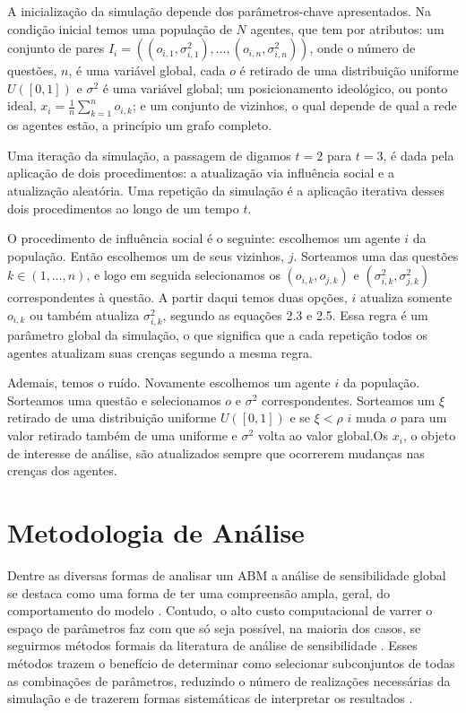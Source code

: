 A inicialização da simulação depende dos parâmetros-chave apresentados. Na
condição inicial temos uma população de \(N\) agentes, que tem por atributos: um
conjunto de pares \(I_i = ((o_{i,1},\sigma_{i,1}^2), \ldots, (o_{i,n},\sigma_{i,n}^2))\), onde
o número de questões, \(n\), é uma variável global, cada \(o\) é retirado de uma
distribuição uniforme \(U([0,1])\) e \(\sigma^2\) é uma variável global; um posicionamento
ideológico, ou ponto ideal, \(x_i = \frac{1}{n} \sum_{k = 1}^n o_{i,k} \); e um
conjunto de vizinhos, o qual depende de qual a rede os agentes estão, a
princípio um grafo completo.

 Uma iteração da simulação, a
passagem de digamos \(t=2\) para \(t=3\), é dada pela aplicação de dois
procedimentos: a atualização via influência social e a atualização aleatória.
Uma repetição da simulação é a aplicação iterativa desses dois procedimentos ao
longo de um tempo \(t \).

O procedimento de influência social é o seguinte: escolhemos um agente \(i\)
da população. Então escolhemos um de seus vizinhos, \(j\). Sorteamos uma das
questões \(k \in (1,\ldots,n)\), e logo em seguida selecionamos os \((o_{i,k},o_{j,k})\) e
\((\sigma_{i,k}^2,\sigma_{j,k}^2)\) correspondentes à questão. A partir daqui temos duas
opções, \(i\) atualiza somente \(o_{i,k}\) ou também atualiza \(\sigma_{i,k}^2\),
segundo as equações 2.3 e 2.5. Essa regra é um parâmetro global da simulação,
o que significa que a cada repetição todos os agentes atualizam suas crenças
segundo a mesma regra.

Ademais, temos o ruído. Novamente escolhemos um agente \(i\) da população.
Sorteamos uma questão e selecionamos \(o\) e \(\sigma^2\) correspondentes. Sorteamos
um \(\xi\) retirado de uma distribuição uniforme \(U([0,1])\) e se \(\xi < \rho\) \(i\)
muda \(o\) para um valor retirado também de uma uniforme e \(\sigma^2\) volta ao
valor global.Os \(x_i\), o objeto de interesse de análise, são atualizados
sempre que ocorrerem mudanças nas crenças dos agentes.



\section{Metodologia de Análise}

Dentre as diversas formas de analisar um ABM a análise de sensibilidade global
se destaca como uma forma de ter uma compreensão ampla, geral, do comportamento
do modelo \cite{north2007managing}. Contudo, o  alto custo computacional de varrer
o espaço de parâmetros faz com que só seja possível, na maioria dos casos, se
seguirmos métodos formais da literatura de análise de sensibilidade
\cite{railsback2012agent}. Esses métodos trazem o benefício de determinar como
selecionar subconjuntos de todas as combinações de parâmetros, reduzindo o
número de realizações necessárias da simulação e de trazerem formas sistemáticas
de interpretar os resultados \cite{railsback2012agent}.

